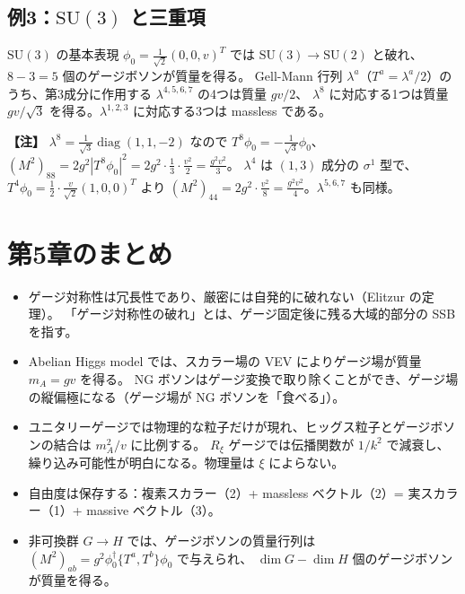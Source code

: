 \documentclass[uplatex,dvipdfmx,a4paper,11pt,openany]{jsbook}
\newenvironment{note}{\vspace{1ex}\par\footnotesize\noindent\textbf{【注】}}{\par\vspace{1ex}}
\numberwithin{equation}{chapter}
\theoremstyle{definition}
\theoremstyle{plain}
\theoremstyle{remark}
\newcommand{\SU}{\mathrm{SU}}
\newcommand{\diag}{\operatorname{diag}}
\begin{document}
\subsection{例3：$\SU(3)$ と三重項}
$\SU(3)$ の基本表現 $\phi_0=\frac{1}{\sqrt2}(0,0,v)^T$ では $\SU(3)\to\SU(2)$ と破れ、
$8-3=5$ 個のゲージボソンが質量を得る。
Gell-Mann 行列 $\lambda^a$（$T^a=\lambda^a/2$）のうち、第3成分に作用する $\lambda^{4,5,6,7}$ の4つは質量 $gv/2$、
$\lambda^8$ に対応する1つは質量 $gv/\sqrt3$ を得る。$\lambda^{1,2,3}$ に対応する3つは massless である。
\begin{note}
$\lambda^8=\frac{1}{\sqrt3}\diag(1,1,-2)$ なので $T^8\phi_0=-\frac{1}{\sqrt3}\phi_0$、
$(M^2)_{88}=2g^2|T^8\phi_0|^2=2g^2\cdot\frac13\cdot\frac{v^2}{2}=\frac{g^2v^2}{3}$。
$\lambda^4$ は $(1,3)$ 成分の $\sigma^1$ 型で、$T^4\phi_0=\frac12\cdot\frac{v}{\sqrt2}(1,0,0)^T$ より
$(M^2)_{44}=2g^2\cdot\frac{v^2}{8}=\frac{g^2v^2}{4}$。$\lambda^{5,6,7}$ も同様。
\end{note}
\section*{第5章のまとめ}
\begin{itemize}
    \item ゲージ対称性は冗長性であり、厳密には自発的に破れない（Elitzur の定理）。
    「ゲージ対称性の破れ」とは、ゲージ固定後に残る大域的部分の SSB を指す。
    \item Abelian Higgs model では、スカラー場の VEV によりゲージ場が質量 $m_A=gv$ を得る。
    NG ボソンはゲージ変換で取り除くことができ、ゲージ場の縦偏極になる（ゲージ場が NG ボソンを「食べる」）。
    \item ユニタリーゲージでは物理的な粒子だけが現れ、ヒッグス粒子とゲージボソンの結合は $m_A^2/v$ に比例する。
    $R_\xi$ ゲージでは伝播関数が $1/k^2$ で減衰し、繰り込み可能性が明白になる。物理量は $\xi$ によらない。
    \item 自由度は保存する：複素スカラー（2）+ massless ベクトル（2）= 実スカラー（1）+ massive ベクトル（3）。
    \item 非可換群 $G\to H$ では、ゲージボソンの質量行列は $(M^2)_{ab}=g^2\phi_0^\dagger\{T^a,T^b\}\phi_0$ で与えられ、
    $\dim G-\dim H$ 個のゲージボソンが質量を得る。
\end{itemize}
\end{document}
